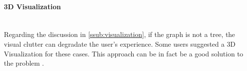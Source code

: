   \paragraph*{3D Visualization} \hfill \\
  \indent Regarding the discussion in \ref{ssub:visualization}, if the graph is not a tree, the visual clutter can degradate the user's experience.
  Some users suggested a 3D Visualization for these cases.
  This approach can be in fact be a good solution to the problem \cite{Lamere2007using3D}.


